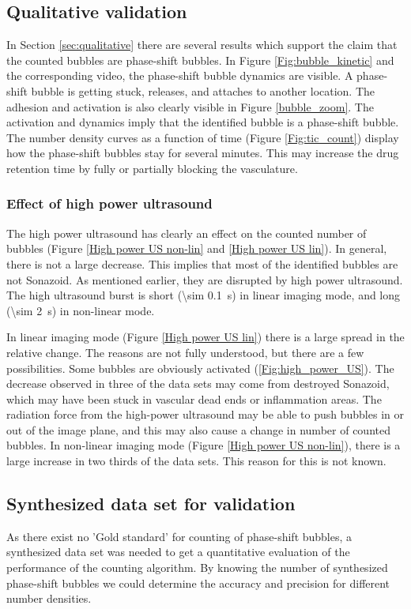 \subsection{Qualitative validation}
In Section \ref{sec:qualitative} there are several results which support the claim that the counted bubbles are phase-shift bubbles. In Figure \ref{Fig:bubble_kinetic} and the corresponding video, the phase-shift bubble dynamics are visible. A phase-shift bubble is getting stuck, releases, and attaches to another location. The adhesion and activation is also clearly visible in Figure \ref{bubble_zoom}. The activation and dynamics imply that the identified bubble is a phase-shift bubble. The number density curves as a function of time (Figure \ref{Fig:tic_count}) display how the phase-shift bubbles stay for several minutes. This may increase the drug retention time by fully or partially blocking the vasculature.

\subsubsection{Effect of high power ultrasound}
The high power ultrasound has clearly an effect on the counted number of bubbles (Figure \ref{High power US non-lin} and \ref{High power US lin}). In general, there is not a large decrease. This implies that most of the identified bubbles are not Sonazoid\texttrademark{}. As mentioned earlier, they are disrupted by high power ultrasound. The high ultrasound burst is short (\SI{\sim 0.1}{\second}) in linear imaging mode, and long (\SI{\sim 2}{\second}) in non-linear mode.

In linear imaging mode (Figure \ref{High power US lin}) there is a large spread in the relative change. The reasons are not fully understood, but there are a few possibilities. Some bubbles are obviously activated (\ref{Fig:high_power_US}). The decrease observed in three of the data sets may come from destroyed Sonazoid\texttrademark{}, which may have been stuck in vascular dead ends or inflammation areas\cite{Healey_pc}. The radiation force from the high-power ultrasound may be able to push bubbles in or out of the image plane, and this may also cause a change in number of counted bubbles. In non-linear imaging mode (Figure \ref{High power US non-lin}), there is a large increase in two thirds of the data sets. This reason for this is not known.

\subsection{Synthesized data set for validation}
As there exist no 'Gold standard' for counting of phase-shift bubbles, a synthesized data set was needed to get a quantitative evaluation of the performance of the counting algorithm. By knowing the number of synthesized phase-shift bubbles we could determine the accuracy and precision for different number densities.


